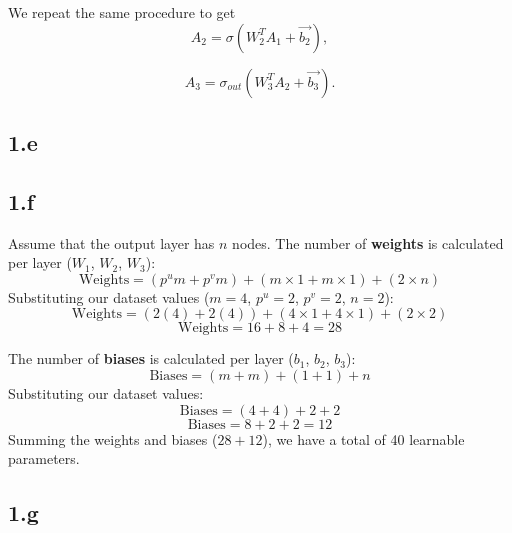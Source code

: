 \documentclass[12pt,halfline,a4paper,]{ouparticle}
\newenvironment{Shaded}{\begin{snugshade}}{\end{snugshade}}
\newcommand{\CommentTok}[1]{\textcolor[rgb]{0.56,0.35,0.01}{\textit{#1}}}
\newcommand{\DecValTok}[1]{\textcolor[rgb]{0.00,0.00,0.81}{#1}}
\newcommand{\FunctionTok}[1]{\textcolor[rgb]{0.13,0.29,0.53}{\textbf{#1}}}
\newcommand{\NormalTok}[1]{#1}
\newcommand{\OtherTok}[1]{\textcolor[rgb]{0.56,0.35,0.01}{#1}}
\newcommand{\SpecialCharTok}[1]{\textcolor[rgb]{0.81,0.36,0.00}{\textbf{#1}}}
\begin{document}
We repeat the same procedure to get \[
A_2 = \sigma(W_2^T A_1 + \vec{b_2}),
\]

\[
A_3 = \sigma_{out}(W_3^T A_2 + \vec{b_3}).
\]

\subsection*{1.e}\label{e}

\begin{Shaded}
\end{Shaded}

\subsection*{1.f}\label{f}

Assume that the output layer has \(n\) nodes. The number of
\textbf{weights} is calculated per layer (\(W_1\), \(W_2\), \(W_3\)): \[
\text{Weights} = (p^u m + p^v m) + (m \times 1 + m \times 1) + (2 \times n)
\] Substituting our dataset values (\(m = 4\), \(p^u = 2\), \(p^v = 2\),
\(n = 2\)): \[
\text{Weights} = (2(4) + 2(4)) + (4 \times 1 + 4 \times 1) + (2 \times 2)
\] \[
\text{Weights} = 16 + 8 + 4 = 28
\]

The number of \textbf{biases} is calculated per layer (\(b_1\), \(b_2\),
\(b_3\)): \[
\text{Biases} = (m + m) + (1 + 1) + n
\] Substituting our dataset values: \[
\text{Biases} = (4 + 4) + 2 + 2
\] \[
\text{Biases} = 8 + 2 + 2 = 12
\] Summing the weights and biases (\(28 + 12\)), we have a total of 40
learnable parameters.

\subsection*{1.g}\label{g}
\end{document}
